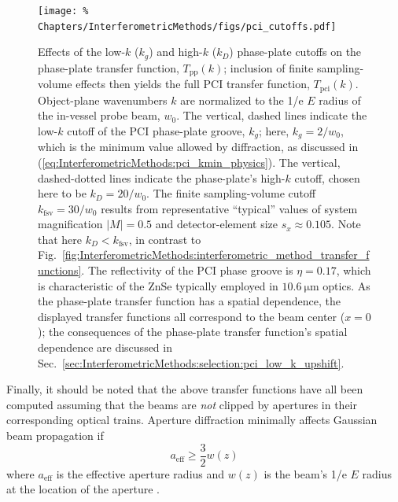 \begin{figure}
  \centering
  \texttt{[image: \%
    Chapters/InterferometricMethods/figs/pci\_cutoffs.pdf]}
  \caption[Effects of phase-plate and finite sampling-volume cutoffs
      on the PCI transfer function]{%
    Effects of the low-$k$ ($k_g$) and high-$k$ ($k_D$) phase-plate cutoffs
    on the phase-plate transfer function, $T_{\text{pp}}(k)$;
    inclusion of finite sampling-volume effects
    then yields the full PCI transfer function, $T_{\text{pci}}(k)$.
    Object-plane wavenumbers $k$ are normalized
    to the 1/e $E$ radius of the in-vessel probe beam, $w_0$.
    The vertical, dashed lines indicate
    the low-$k$ cutoff of the PCI phase-plate groove, $k_g$;
    here, $k_g = 2 / w_0$,
    which is the minimum value allowed by diffraction,
    as discussed in
    (\ref{eq:InterferometricMethods:pci_kmin_physics}).
    The vertical, dashed-dotted lines indicate
    the phase-plate's high-$k$ cutoff,
    chosen here to be $k_D = 20 / w_0$.
    The finite sampling-volume cutoff $k_{\text{fsv}} = 30 / w_0$
    results from representative ``typical'' values of
    system magnification $|M| = 0.5$ and
    detector-element size $s_x \approx 0.105$.
    Note that here $k_D < k_{\text{fsv}}$, in contrast to
    Fig.~\ref{fig:InterferometricMethods:interferometric_method_transfer_functions}.
    The reflectivity of the PCI phase groove is $\eta = 0.17$,
    which is characteristic of the ZnSe typically
    employed in $\SI{10.6}{\micro\meter}$ optics.
    As the phase-plate transfer function has a spatial dependence,
    the displayed transfer functions all correspond
    to the beam center ($x = 0$);
    the consequences of
    the phase-plate transfer function's spatial dependence
    are discussed in
    Sec.~\ref{sec:InterferometricMethods:selection:pci_low_k_upshift}.
  }
\label{fig:InterferometricMethods:pci_cutoffs}
\end{figure}

Finally, it should be noted that the above transfer functions
have all been computed assuming that the beams are \emph{not} clipped
by apertures in their corresponding optical trains.
Aperture diffraction minimally affects Gaussian beam propagation if
\begin{equation}
  a_{\text{eff}} \geq \frac{3}{2} w(z)
  \label{eq:InterferometricMethods:aperture_radius_for_minimal_diffraction}
\end{equation}
where $a_{\text{eff}}$ is the effective aperture radius and
$w(z)$ is the beam's 1/e $E$ radius at the location of the aperture
\cite{campbell_josa69, rost_diffraction_pc14}.


